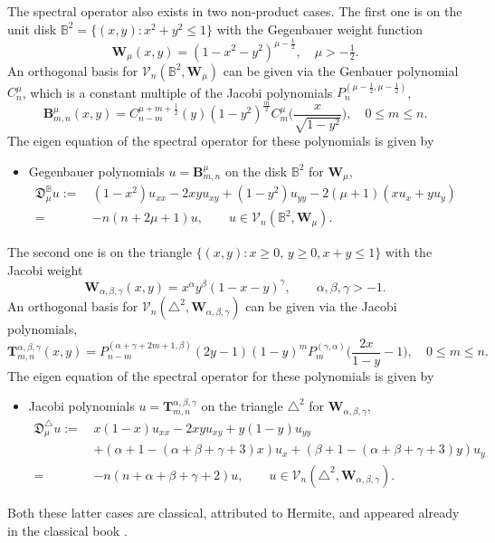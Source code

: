 \documentclass{amsart}
\theoremstyle{remark}
\def\fD{{\mathfrak D}}
\def\a{{\alpha}}
\def\b{{\beta}}
\def\g{{\gamma}}
\def\Bb{{\bm B}}
\def\Tb{{\bm T}}
\def\Wb{{\bm W}}
\def\CV{{\mathcal V}}
\def\BB{{\mathbb B}}
\def\f{\frac}
\begin{document}
The spectral operator also exists in two non-product cases. The first one is on the unit disk 
$\BB^2 =\{(x,y): x^2+y^2 \le 1\}$ with the Gegenbauer weight function
$$
  \Wb_\mu(x,y) = (1-x^2-y^2)^{\mu-\frac12}, \quad \mu > -\tfrac12. 
$$
An orthogonal basis for $\CV_n(\BB^2, \Wb_\mu)$ can be given via the Genbauer polynomial 
$C_n^\mu$, which is a constant multiple of the Jacobi polynomials $P_n^{(\mu-\f12, \mu-\f12)}$, 
\begin{equation} \label{eq:OP_BB2}
  \Bb_{m,n}^\mu(x,y) = C_{n-m}^{\mu+m +\f12}(y) (1-y^2)^{\f m 2} C_m^\mu\bigg(\frac{x}{\sqrt{1-y^2}}\bigg),
  \quad 0 \le m \le n.
\end{equation}
The eigen equation of the spectral operator for these polynomials is given by 
\begin{itemize}
\item Gegenbauer polynomials $u = \Bb_{m,n}^\mu$ on the disk $\BB^2$ for $\Wb_\mu$, 
\begin{align*}
 \fD_\mu^\BB u := \,& (1-x^2) u_{x x} - 2xy u_{xy} + (1-y^2) u_{yy} - 2(\mu+1) (x u_x +  y u_ y) \\
    = \, & - n(n+2\mu +1)u, \qquad u \in \CV_n(\BB^2,  \Wb_\mu).
\end{align*}
\end{itemize}
The second one is on the triangle $\{(x,y): x \ge 0, \, y\ge 0, x+y \le 1\}$ with the Jacobi weight
$$
     \Wb_{\a,\b,\g}(x,y) = x^\a y ^\b(1-x-y)^\g, \qquad \a, \b, \g > -1.
$$
An orthogonal basis for $\CV_n(\triangle^2, \Wb_{\a,\b,\g})$ can be given via the 
Jacobi polynomials,
\begin{equation} \label{eq:OP_TT2}
  \Tb_{m,n}^{\a,\b,\g}(x,y) = P_{n-m}^{(\a+\g+2m+1,\b)}(2y-1) (1-y)^m
     P_m^{(\g, \a)}\bigg(\frac{2x}{1-y} -1\bigg),
  \quad 0 \le m \le n.
\end{equation}
The eigen equation of the spectral operator for these polynomials is given by 
\begin{itemize}
\item Jacobi polynomials $u =  \Tb_{m,n}^{\a,\b,\g}$ on the triangle $\triangle^2$ for $\Wb_{\a,\b,\g}$,
\begin{align*}
 \fD_\mu^\triangle u := \,& x(1-x) u_{x x} - 2xy u_{xy} + y(1-y) u_{yy} \\
    &  +(\a+1 - (\a+\b+\g+3)x)u_x +  (\b+1 - (\a+\b+\g+3)y )u_ y \\
    =  \, &  - n(n+\a+\b+\g+2)u, \qquad u \in \CV_n(\triangle^2, \Wb_{\a,\b,\g}).
\end{align*}
\end{itemize}
Both these latter cases are classical, attributed to Hermite, and appeared already in the 
classical book \cite{AK}. 
\end{document}
